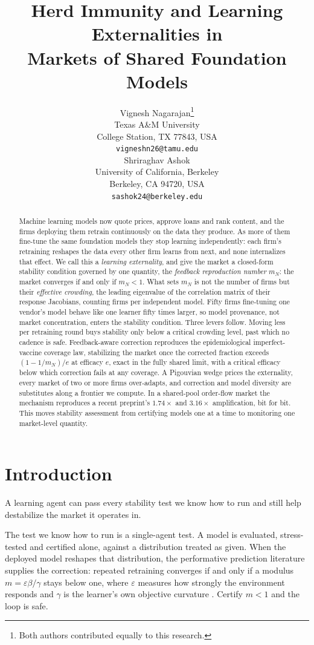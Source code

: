 \documentclass{article}
\title{Herd Immunity and Learning Externalities in\\ Markets of Shared Foundation Models}
\author{%
  Vignesh Nagarajan\thanks{Both authors contributed equally to this research.} \\
  Texas A\&M University \\
  College Station, TX 77843, USA \\
  \texttt{vigneshn26@tamu.edu} \\
  \And
  Shriraghav Ashok\footnotemark[1] \\
  University of California, Berkeley \\
  Berkeley, CA 94720, USA \\
  \texttt{sashok24@berkeley.edu} \\
}
\theoremstyle{plain}
\theoremstyle{definition}
\newcommand{\mN}{m_N}
\begin{document}
\maketitle

\begin{abstract}
Machine learning models now quote prices, approve loans and rank content, and the firms deploying them retrain continuously on the data they produce. As more of them fine-tune the same foundation models they stop learning independently: each firm's retraining reshapes the data every other firm learns from next, and none internalizes that effect. We call this a \emph{learning externality}, and give the market a closed-form stability condition governed by one quantity, the \emph{feedback reproduction number} $\mN$: the market converges if and only if $\mN < 1$. What sets $\mN$ is not the number of firms but their \emph{effective crowding}, the leading eigenvalue of the correlation matrix of their response Jacobians, counting firms per independent model. Fifty firms fine-tuning one vendor's model behave like one learner fifty times larger, so model provenance, not market concentration, enters the stability condition. Three levers follow. Moving less per retraining round buys stability only below a critical crowding level, past which no cadence is safe. Feedback-aware correction reproduces the epidemiological imperfect-vaccine coverage law, stabilizing the market once the corrected fraction exceeds $(1-1/\mN)/e$ at efficacy $e$, exact in the fully shared limit, with a critical efficacy below which correction fails at any coverage. A Pigouvian wedge prices the externality, every market of two or more firms over-adapts, and correction and model diversity are substitutes along a frontier we compute. In a shared-pool order-flow market the mechanism reproduces a recent preprint's $1.74\times$ and $3.16\times$ amplification, bit for bit. This moves stability assessment from certifying models one at a time to monitoring one market-level quantity.
\end{abstract}

\section{Introduction}

A learning agent can pass every stability test we know how to run and still help destabilize the market it operates in.

The test we know how to run is a single-agent test. A model is evaluated, stress-tested and certified alone, against a distribution treated as given. When the deployed model reshapes that distribution, the performative prediction literature supplies the correction: repeated retraining converges if and only if a modulus $m = \varepsilon\beta/\gamma$ stays below one, where $\varepsilon$ measures how strongly the environment responds and $\gamma$ is the learner's own objective curvature \citep{perdomo2020}. Certify $m<1$ and the loop is safe.
\end{document}
